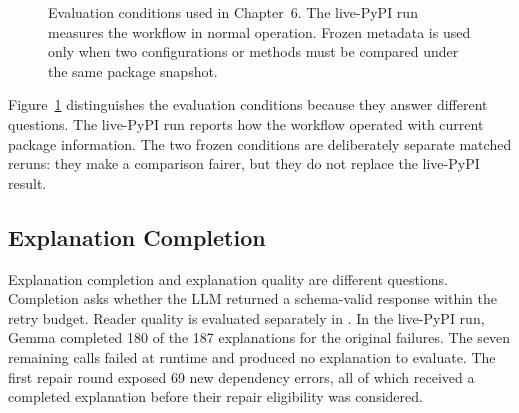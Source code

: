 \begin{figure}[htbp]
  \centering
  \caption{Evaluation conditions used in Chapter~6. The live-PyPI run measures
  the workflow in normal operation. Frozen metadata is used only when two
  configurations or methods must be compared under the same package snapshot.}
  \label{fig:v-evaluation-conditions}
\end{figure}
\FloatBarrier

Figure~\ref{fig:v-evaluation-conditions} distinguishes the evaluation
conditions because they answer different questions. The live-PyPI run reports
how the workflow operated with current package information. The two frozen
conditions are deliberately separate matched reruns: they make a comparison
fairer, but they do not replace the live-PyPI result.

\subsection{Explanation Completion}
\label{sec:v-final-explanation}

Explanation completion and explanation quality are different questions.
Completion asks whether the LLM returned a schema-valid response within the
retry budget. Reader quality is evaluated separately in
. In the live-PyPI run, Gemma completed 180 of the
187 explanations for the original failures. The seven remaining calls failed
at runtime and produced no explanation to evaluate. The first repair round
exposed 69 new dependency errors, all of which received a completed
explanation before their repair eligibility was considered.

